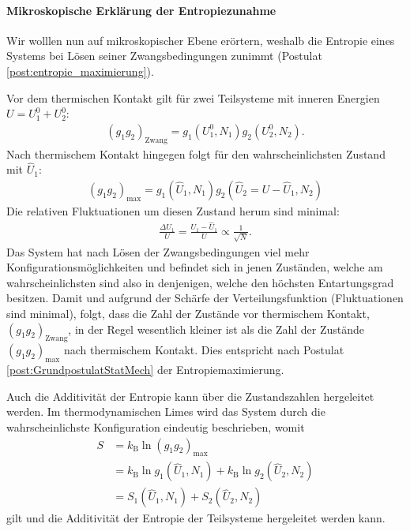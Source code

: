 \paragraph*{Mikroskopische Erklärung der Entropiezunahme}
Wir wolllen nun auf mikroskopischer Ebene erörtern, weshalb die Entropie eines Systems bei Lösen seiner Zwangsbedingungen zunimmt (Postulat \ref{post:entropie_maximierung}).

Vor dem thermischen Kontakt gilt für zwei Teilsysteme mit inneren Energien $U=U^0_1+U^0_2$:
\begin{align*}
    (g_1g_2)_\mathrm{Zwang}=g_1(U^0_1,N_1)g_2(U^0_2,N_2).
\end{align*}
Nach thermischem Kontakt hingegen folgt für den wahrscheinlichsten Zustand mit $\hat{U}_1$:
\begin{align*}
    (g_1g_2)_\mathrm{max}=g_1(\hat{U}_1,N_1)g_2(\hat{U}_2=U-\hat{U}_1,N_2)
\end{align*}
Die relativen Fluktuationen um diesen Zustand herum sind minimal:
\begin{align*}
    \frac{\Delta U_1}{U}=\frac{U_1-\hat{U}_1}{U}\propto \frac{1}{\sqrt{N}}.
\end{align*}
Das System hat nach Lösen der Zwangsbedingungen viel mehr Konfigurationsmöglichkeiten und befindet sich in jenen Zuständen, welche am wahrscheinlichsten sind \textendash{} also in denjenigen, welche den höchsten Entartungsgrad besitzen. Damit und aufgrund der Schärfe der Verteilungsfunktion (Fluktuationen sind minimal), folgt, dass die Zahl der Zustände vor thermischem Kontakt, $(g_1g_2)_\mathrm{Zwang}$, in der Regel wesentlich kleiner ist als die Zahl der Zustände $(g_1g_2)_\mathrm{max}$ nach thermischem Kontakt. Dies entspricht nach Postulat \ref{post:GrundpostulatStatMech} der Entropiemaximierung.

Auch die Additivität der Entropie kann über die Zustandszahlen hergeleitet werden. Im thermodynamischen Limes wird das System durch die wahrscheinlichste Konfiguration eindeutig beschrieben, womit 
\begin{align*}
    S&=k_\mathrm{B}\ln (g_1g_2)_\mathrm{max}\\
    &=k_\mathrm{B}\ln g_1(\hat{U}_1,N_1)+k_\mathrm{B}\ln g_2(\hat{U}_2,N_2)\\
    &=S_1(\hat{U}_1,N_1)+S_2(\hat{U}_2,N_2)
\end{align*}
gilt und die Additivität der Entropie der Teilsysteme hergeleitet werden kann.


